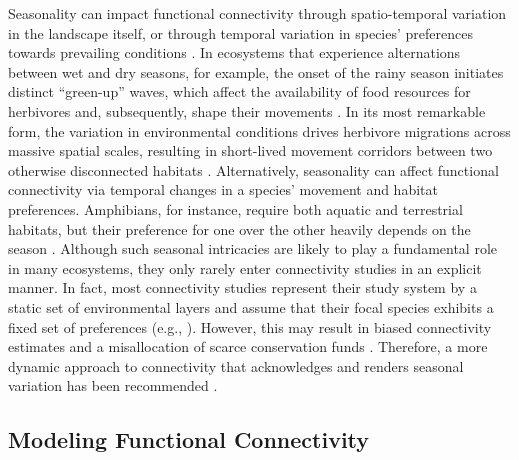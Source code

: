 \documentclass[abstract=on,10pt,a4paper,bibliography=totocnumbered]{article}
\begin{document}
Seasonality can impact functional connectivity through spatio-temporal variation
in the landscape itself, or through temporal variation in species' preferences
towards prevailing conditions \citep{Mui.2017, Simpkins.2017a, Zeller.2020a}. In
ecosystems that experience alternations between wet and dry seasons, for
example, the onset of the rainy season initiates distinct ``green-up'' waves,
which affect the availability of food resources for herbivores and,
subsequently, shape their movements \citep{Merkle.2016}. In its most remarkable
form, the variation in environmental conditions drives herbivore migrations
across massive spatial scales, resulting in short-lived movement corridors
between two otherwise disconnected habitats \citep{Serneels.2001, Naidoo.2016}.
Alternatively, seasonality can affect functional connectivity via temporal
changes in a species' movement and habitat preferences. Amphibians, for
instance, require both aquatic and terrestrial habitats, but their preference
for one over the other heavily depends on the season \citep{Baldwin.2006}.
Although such seasonal intricacies are likely to play a fundamental role in many
ecosystems, they only rarely enter connectivity studies in an explicit manner.
In fact, most connectivity studies represent their study system by a static set
of environmental layers and assume that their focal species exhibits a fixed set
of preferences (e.g., \citealp{Elliot.2014, Abrahms.2017, Brennan.2020}).
However, this may result in biased connectivity estimates and a misallocation of
scarce conservation funds \citep{Osipova.2019, Zeller.2020}. Therefore, a more
dynamic approach to connectivity that acknowledges and renders seasonal
variation has been recommended \citep{Zeller.2020a}.

\subsection{Modeling Functional Connectivity}
\end{document}
